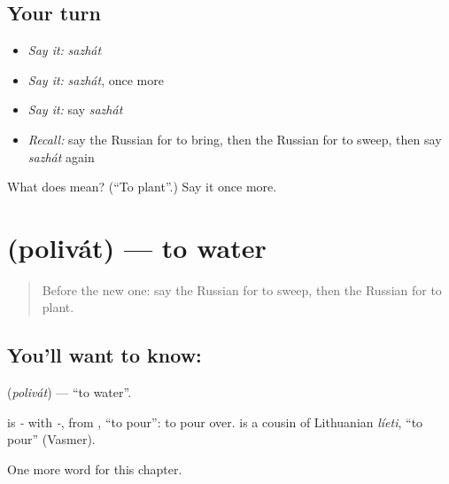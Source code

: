 \subsection*{Your turn}
\begin{itemize}
\raggedright
  \item \emph{Say it:} \emph{sazhát}
  \item \emph{Say it:} \emph{sazhát}, once more
  \item \emph{Say it:} say \emph{sazhát}
  \item \emph{Recall:} say the Russian for to bring, then the Russian for to sweep, then say \emph{sazhát} again
\end{itemize}

\begin{tcolorbox}[breakable,colback=teal!4,colframe=teal!35!black,title={Before you move on}]
What does  mean? (\textquotedblleft{}To plant\textquotedblright{}.) Say it once more.
\end{tcolorbox}
\section[\texorpdfstring{\ru{поливать} (polivát)}{поливать (polivát)}]{ (polivát) — to water}

\label{lesson:RU-C234-polivat}



\begin{quote}
Before the new one: say the Russian for to sweep, then the Russian for to plant.
\end{quote}

\subsection*{You'll want to know: }
\textbf{} (\emph{polivát}) — \textquotedblleft{}to water\textquotedblright{}.

\begin{cousinweb}
\textbf{} is \emph{-} with \emph{-}, from \emph{}, \textquotedblleft{}to pour\textquotedblright{}: to pour over. \emph{} is a cousin of Lithuanian \emph{líeti}, \textquotedblleft{}to pour\textquotedblright{} (Vasmer).
\end{cousinweb}

\begin{grammarlens}[title={What you've built}]
One more word for this chapter.
\end{grammarlens}

